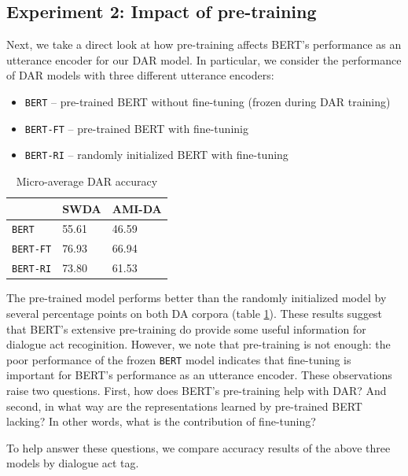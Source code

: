 \documentclass[11pt,a4paper]{article}
\begin{document}
\subsection{Experiment 2: Impact of pre-training} %
Next, we take a direct look at how pre-training affects BERT's performance as an utterance encoder for our DAR model.
In particular, we consider the performance of DAR models with three different utterance encoders:
\begin{itemize}
  \item \texttt{BERT} -- pre-trained BERT without fine-tuning (frozen during DAR training)
  \item \texttt{BERT-FT} -- pre-trained BERT with fine-tuninig 
  \item \texttt{BERT-RI} -- randomly initialized BERT with fine-tuning 
\end{itemize}

\begin{table}[]
\centering 
\begin{tabular}{@{}lll@{}}
\toprule
                 & SWDA  & AMI-DA \\ \midrule
\texttt{BERT}       & 55.61 & 46.59  \\
\texttt{BERT-FT}    & 76.93 & 66.94  \\
\texttt{BERT-RI}    & 73.80 & 61.53  
\end{tabular}
  \caption{Micro-average DAR accuracy}
  \label{table:exp2-avg}
\end{table}    

The pre-trained model performs better than the randomly initialized model by several percentage points on both DA corpora (table \ref{table:exp2-avg}). 
These results suggest that BERT's extensive pre-training do provide some useful information for dialogue act recoginition.
However, we note that pre-training is not enough: the poor performance of the frozen \texttt{BERT} model indicates that fine-tuning is important for BERT's performance as an utterance encoder.
These observations raise two questions.
First, how does BERT's pre-training help with DAR? 
And second, in what way are the representations learned by pre-trained BERT lacking?
In other words, what is the contribution of fine-tuning?

To help answer these questions, we compare accuracy results of the above three models by dialogue act tag.

\end{document}
